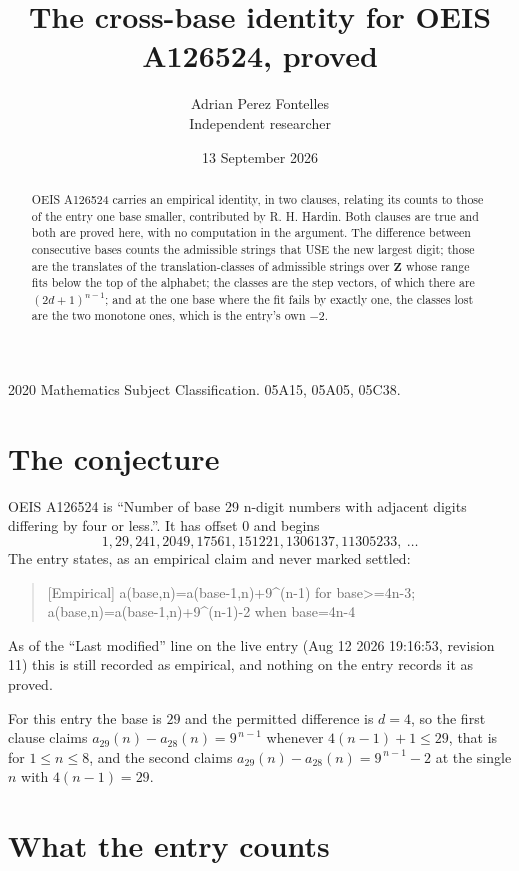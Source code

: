 \documentclass[11pt,a4paper]{article}
\title{The cross-base identity for OEIS A126524, proved}
\author{Adrian Perez Fontelles\\ \small Independent researcher}
\date{13 September 2026}
\theoremstyle{plain}
\theoremstyle{definition}
\begin{document}
\maketitle

\begin{abstract}
OEIS A126524 carries an empirical identity, in two clauses, relating its counts to those of the
entry one base smaller, contributed by R. H. Hardin. Both clauses are true and both are proved
here, with no computation in the argument. The difference between consecutive bases counts the
admissible strings that USE the new largest digit; those are the translates of the
translation-classes of admissible strings over $\mathbf{Z}$ whose range fits below the top of
the alphabet; the classes are the step vectors, of which there are $(2d+1)^{n-1}$; and at the
one base where the fit fails by exactly one, the classes lost are the two monotone ones, which
is the entry's own $-2$.
\end{abstract}

\noindent\small 2020 Mathematics Subject Classification. 05A15, 05A05, 05C38.\normalsize

\section{The conjecture}

OEIS A126524 is ``Number of base 29 n-digit numbers with adjacent digits differing by four or less.''. It has offset $0$ and begins
\[
1, 29, 241, 2049, 17561, 151221, 1306137, 11305233,\ \dots
\]
The entry states, as an empirical claim and never marked settled:
\begin{quote}
[Empirical] a(base,n)=a(base-1,n)+9\textasciicircum{}(n-1) for base>=4n-3; a(base,n)=a(base-1,n)+9\textasciicircum{}(n-1)-2 when base=4n-4
\end{quote}
As of the ``Last modified'' line on the live entry (Aug 12 2026 19:16:53, revision 11)
this is still recorded as empirical, and nothing on the entry records it as proved.

For this entry the base is $29$ and the permitted difference is $d=4$, so the first clause
claims $a_{29}(n)-a_{28}(n)=9^{\,n-1}$ whenever $4(n-1)+1\le29$, that is for
$1\le n\le8$, and the second claims $a_{29}(n)-a_{28}(n)=9^{\,n-1}-2$ at the single
$n$ with $4(n-1)=29$.

\section{What the entry counts}
\end{document}
